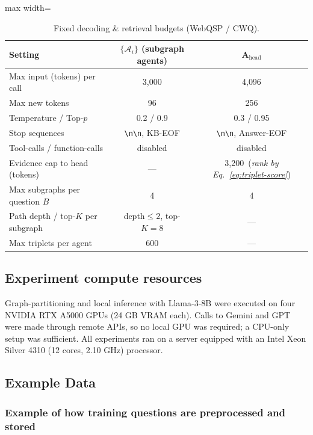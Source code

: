 \documentclass[sigconf]{acmart}
\begin{document}
\begin{table}[h]
  \centering
  \caption{Fixed decoding \& retrieval budgets (WebQSP / CWQ).}
  \label{table:agent-budgets-webcwq}
  \vspace{-2mm}
  \begin{adjustbox}{max width=\columnwidth}
  \begin{tabular}{l|c|c}
    \toprule
    Setting & \(\{\mathcal{A}_i\}\) (subgraph agents) & \(\mathbf{A}_{\text{head}}\) \\
    \midrule
    Max input (tokens) per call & 3{,}000 & 4{,}096 \\
    Max new tokens & 96 & 256 \\
    Temperature / Top-$p$ & 0.2 / 0.9 & 0.3 / 0.95 \\
    Stop sequences & \texttt{\textbackslash n\textbackslash n}, KB-EOF & \texttt{\textbackslash n\textbackslash n}, Answer-EOF \\
    Tool-calls / function-calls & disabled & disabled \\
    Evidence cap to head (tokens) & --- & 3{,}200 \,(\textit{rank by Eq.~\eqref{eq:triplet-score}}) \\
    Max subgraphs per question \(B\) & 4 & 4 \\
    Path depth / top-$K$ per subgraph & depth\(\le 2\), top-$K=8$ & --- \\
    Max triplets per agent & 600 & --- \\
    \bottomrule
  \end{tabular}
  \end{adjustbox}
  \vspace{-2mm}
\end{table}

\subsection{Experiment compute resources}

Graph-partitioning and local inference with Llama-3-8B were executed on four NVIDIA RTX A5000 GPUs (24 GB VRAM each).
Calls to Gemini and GPT were made through remote APIs, so no local GPU was required; a CPU-only setup was sufficient.
All experiments ran on a server equipped with an Intel Xeon Silver 4310 (12 cores, 2.10 GHz) processor.

\subsection{Example Data}
\subsubsection{Example of how training questions are preprocessed and stored} \label{app:training_questions_preprocessing}
\end{document}
